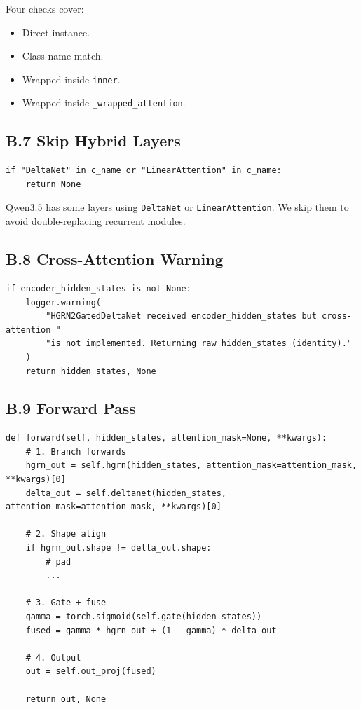 Four checks cover:
\begin{itemize}
\item Direct instance.
\item Class name match.
\item Wrapped inside \texttt{inner}.
\item Wrapped inside \texttt{\_wrapped\_attention}.

\end{itemize}
\subsection{B.7 Skip Hybrid Layers}

\begin{lstlisting}
if "DeltaNet" in c_name or "LinearAttention" in c_name:
    return None
\end{lstlisting}

Qwen3.5 has some layers using \texttt{DeltaNet} or \texttt{LinearAttention}. We skip them 
to avoid double-replacing recurrent modules.

\subsection{B.8 Cross-Attention Warning}

\begin{lstlisting}
if encoder_hidden_states is not None:
    logger.warning(
        "HGRN2GatedDeltaNet received encoder_hidden_states but cross-attention "
        "is not implemented. Returning raw hidden_states (identity)."
    )
    return hidden_states, None
\end{lstlisting}

\subsection{B.9 Forward Pass}

\begin{lstlisting}
def forward(self, hidden_states, attention_mask=None, **kwargs):
    # 1. Branch forwards
    hgrn_out = self.hgrn(hidden_states, attention_mask=attention_mask, **kwargs)[0]
    delta_out = self.deltanet(hidden_states, attention_mask=attention_mask, **kwargs)[0]
    
    # 2. Shape align
    if hgrn_out.shape != delta_out.shape:
        # pad
        ...
    
    # 3. Gate + fuse
    gamma = torch.sigmoid(self.gate(hidden_states))
    fused = gamma * hgrn_out + (1 - gamma) * delta_out
    
    # 4. Output
    out = self.out_proj(fused)
    
    return out, None
\end{lstlisting}

